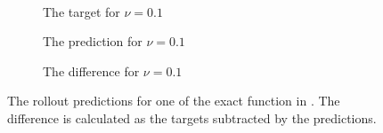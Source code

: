 \documentclass[preprint,12pt,times,authoryear]{elsarticle}
\begin{document}
\begin{figure}[H]
\begin{adjustwidth}{-0.1\linewidth}{-0.1\linewidth}
\begin{subfigure}{0.32\linewidth}
    \end{subfigure}
    \\[0.7\baselineskip]
    \begin{subfigure}{0.33\linewidth}
      \begin{adjustbox}{width=\linewidth}
        
      \end{adjustbox}
      \caption{The target for \(\nu=0.1\)}\label{fig:sc2_exact_target_0.1}
    \end{subfigure}
    \begin{subfigure}{0.33\linewidth}
      \begin{adjustbox}{width=\linewidth}
        
      \end{adjustbox}
      \caption{The prediction for \(\nu=0.1\)}\label{fig:sc2_exact_pred_0.1}
    \end{subfigure}
    \begin{subfigure}{0.32\linewidth}
      \begin{adjustbox}{width=\linewidth}
        
      \end{adjustbox}
      \caption{The difference for \(\nu=0.1\)}\label{fig:sc2_exact_diff_0.1}
    \end{subfigure}
  \end{adjustwidth}
  \caption{The rollout predictions for one of the exact function in . The difference is calculated as the targets subtracted by the predictions.}\label{fig:scenario_2_exact}
\end{figure}
\end{document}

